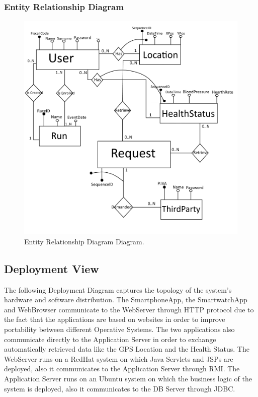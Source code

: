 \clearpage

\subsubsection{Entity Relationship Diagram}
\begin{figure}[H]
\centering
\includegraphics[scale=0.65]{Images/ERDiagram.png}
\caption{Entity Relationship Diagram Diagram.}
\end{figure}

\newpage
\subsection{Deployment View}
The following Deployment Diagram captures the topology of the system's hardware and software distribution.
\bigbreak
The SmartphoneApp, the SmartwatchApp and WebBrowser communicate to the WebServer through HTTP protocol due to the fact that the applications are based on websites in order to improve portability between different Operative Systems. The two applications also communicate directly to the Application Server in order to exchange automatically retrieved data like the GPS Location and the Health Status.
\bigbreak
The WebServer runs on a RedHat system on which Java Servlets and JSPs are deployed, also it communicates to the Application Server through RMI.\bigbreak
The Application Server runs on an Ubuntu system on which the business logic  of the system is deployed, also it communicates to the DB Server through JDBC.

